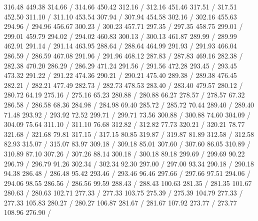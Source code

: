 { 316.48 449.38 314.66 /
 314.66 450.42 312.16 /
 312.16 451.46 317.51 /
 317.51 452.50 311.10 /
 311.10 453.54 307.94 /
 307.94 454.58 302.16 /
 302.16 455.63 294.96 /
 294.96 456.67 300.23 /
 300.23 457.71 297.35 /
 297.35 458.75 299.01 /
 299.01 459.79 294.02 /
 294.02 460.83 300.13 /
 300.13 461.87 289.99 /
 289.99 462.91 291.14 /
 291.14 463.95 288.64 /
 288.64 464.99 291.93 /
 291.93 466.04 286.59 /
 286.59 467.08 291.96 /
 291.96 468.12 287.83 /
 287.83 469.16 282.38 /
 282.38 470.20 286.29 /
 286.29 471.24 291.56 /
 291.56 472.28 293.45 /
 293.45 473.32 291.22 /
 291.22 474.36 290.21 /
 290.21 475.40 289.38 /
 289.38 476.45 282.21 /
 282.21 477.49 282.73 /
 282.73 478.53 283.40 /
 283.40 479.57 280.12 /
\setsolid
{} 280.72 64.19 275.16 /
 275.16 65.23 280.88 /
 280.88 66.27 278.57 /
 278.57 67.32 286.58 /
 286.58 68.36 284.98 /
 284.98 69.40 285.72 /
 285.72 70.44 289.40 /
 289.40 71.48 293.92 /
 293.92 72.52 299.71 /
 299.71 73.56 300.88 /
 300.88 74.60 304.09 /
 304.09 75.64 311.10 /
 311.10 76.68 312.82 /
 312.82 77.73 320.21 /
 320.21 78.77 321.68 /
 321.68 79.81 317.15 /
 317.15 80.85 319.87 /
 319.87 81.89 312.58 /
 312.58 82.93 315.07 /
 315.07 83.97 309.18 /
 309.18 85.01 307.60 /
 307.60 86.05 310.89 /
 310.89 87.10 307.26 /
 307.26 88.14 300.18 /
 300.18 89.18 299.69 /
 299.69 90.22 296.79 /
 296.79 91.26 302.34 /
 302.34 92.30 297.00 /
 297.00 93.34 290.18 /
 290.18 94.38 286.48 /
 286.48 95.42 293.46 /
 293.46 96.46 297.66 /
 297.66 97.51 294.06 /
 294.06 98.55 286.56 /
 286.56 99.59 288.43 /
 288.43 100.63 281.35 /
 281.35 101.67 280.63 /
 280.63 102.71 277.33 /
 277.33 103.75 275.39 /
 275.39 104.79 277.33 /
 277.33 105.83 280.27 /
 280.27 106.87 281.67 /
 281.67 107.92 273.77 /
 273.77 108.96 276.90 /
}
